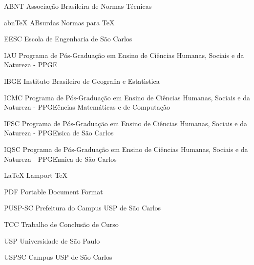 \begin{siglas}
    \item[ABNT] Associa\c{c}\~ao Brasileira de Normas T\'ecnicas
    \item[abnTeX] ABsurdas Normas para TeX
	\item[EESC] Escola de Engenharia de S\~ao Carlos
	\item[IAU] Programa de P\'os-Gradua\c{c}\~ao em Ensino de Ci\^encias Humanas, Sociais e da Natureza - PPGE
	\item[IBGE] Instituto Brasileiro de Geografia e Estat\'{\i}stica
	\item[ICMC] Programa de P\'os-Gradua\c{c}\~ao em Ensino de Ci\^encias Humanas, Sociais e da Natureza - PPGE\^encias Matem\'aticas e de Computa\c{c}\~ao
	\item[IFSC] Programa de P\'os-Gradua\c{c}\~ao em Ensino de Ci\^encias Humanas, Sociais e da Natureza - PPGE\'{\i}sica de S\~ao Carlos
	\item[IQSC] Programa de P\'os-Gradua\c{c}\~ao em Ensino de Ci\^encias Humanas, Sociais e da Natureza - PPGE\'{\i}mica de S\~ao Carlos
	\item[LaTeX] Lamport TeX
	\item[PDF] Portable Document Format
	\item[PUSP-SC] Prefeitura do Campus USP de S\~ao Carlos
	\item[TCC] Trabalho de Conclus\~ao de Curso
	\item[USP] Universidade de S\~ao Paulo
	\item[USPSC] Campus USP de S\~ao Carlos
\end{siglas}
